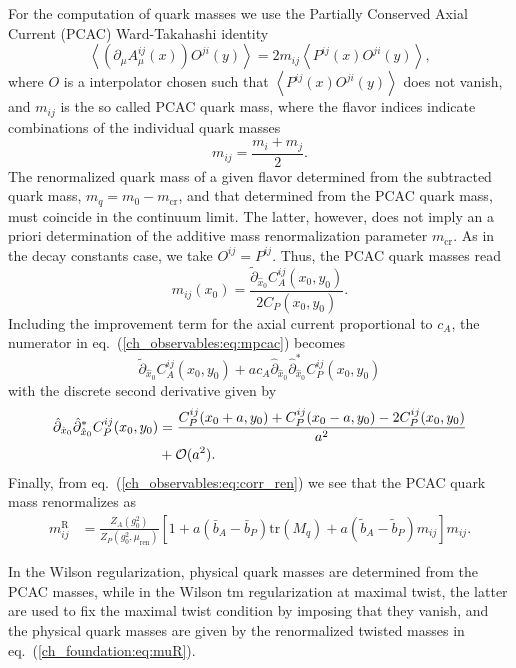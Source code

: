 For the computation of quark masses we use the Partially Conserved Axial Current (PCAC) Ward-Takahashi identity
\begin{equation}
\label{ch_observables:eq:PCAC}
\left<\left(\partial_{\mu}A^{ij}_{\mu}(x)\right)O^{ji}(y)\right>=2m_{ij}\left<P^{ij}(x)O^{ji}(y)\right>,
\end{equation}
where $O$ is a interpolator chosen such that $\left<P^{ij}(x)O^{ji}(y)\right>$ does not vanish, and $m_{ij}$ is the so called PCAC quark mass, where the flavor indices indicate combinations of the individual quark masses
\begin{equation}
m_{ij}=\frac{m_i+m_{j}}{2}.
\end{equation}
The renormalized quark mass of a given flavor determined from the subtracted quark mass, $m_q = m_0 - m_{\textrm{cr}}$, and that determined from the PCAC quark mass, must coincide in the continuum limit. The latter, however, does not imply an a priori determination of the additive mass renormalization parameter $m_{\textrm{cr}}$. As in the decay constants case, we take $O^{ij}=P^{ij}$. Thus, the PCAC quark masses read
\begin{equation}
\label{ch_observables:eq:mpcac}
m_{ij}(x_0)=\frac{\tilde{\partial}_{\hat{x}_0}C_A^{ij}(x_0,y_0)}{2C_P(x_0,y_0)}.
\end{equation}
Including the improvement term for the axial current proportional to $c_A$, the numerator in eq.~(\ref{ch_observables:eq:mpcac}) becomes
\begin{equation}
\tilde{\partial}_{\hat{x}_0}C_A^{ij}(x_0,y_0)+ac_A\hat{\partial}_{\hat{x}_0}\hat{\partial}^*_{\hat{x}_0}C_P^{ij}(x_0,y_0)
\end{equation}
with the discrete second derivative given by
\begin{align}
\hat{\partial}_{\hat{x}_0}\hat{\partial}^*_{\hat{x}_0}C_P^{ij}(x_0,y_0)&=\frac{C_P^{ij}(x_0+a,y_0)+C_P^{ij}(x_0-a,y_0)-2C_P^{ij}(x_0,y_0)}{a^2}\notag\\
&+\mathcal{O}(a^2).
\end{align}
Finally, from eq.~(\ref{ch_observables:eq:corr_ren}) we see that the PCAC quark mass renormalizes as
\begin{align}
\label{ch_observables:eq:mqR}
m_{ij}^{\textrm{R}}&=\frac{Z_A(g_0^2)}{Z_P(g_0^2,\mu_{\textrm{ren}})}\left[1+a\left(\bar{b}_A-\bar{b}_P\right){\textrm{tr}}\left(M_q\right)+a\left(\tilde{b}_A-\tilde{b}_P\right)m_{ij}\right]m_{ij}.
\end{align}

In the Wilson regularization, physical quark masses are determined from the PCAC masses, while in the Wilson tm regularization at maximal twist, the latter are used to fix the maximal twist condition by imposing that they vanish, and the physical quark masses are given by the renormalized twisted masses in eq.~(\ref{ch_foundation:eq:muR}).

